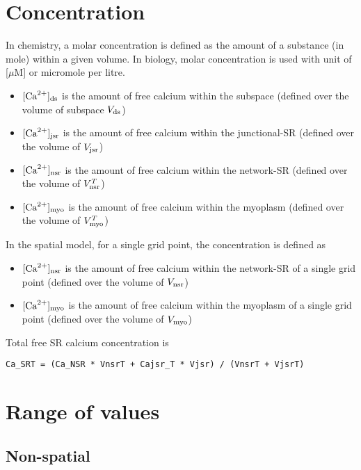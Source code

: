 \section{Concentration}
\label{sec:concentration}

In chemistry, a molar concentration is defined as the amount of a substance (in
mole) within a given volume. In biology, molar concentration is used with unit
of [$\mu$M] or micromole per litre. 
\begin{itemize}
  \item $[{\text{Ca}^{2+}}]_{\text{ds}}$ is the amount of free calcium within the subspace (defined
  over the volume of subspace $V_{\text{ds}}$)
  \item $[{\text{Ca}^{2+}}]_{\text{jsr}}$ is the amount of free calcium within the junctional-SR
  (defined over the volume of $V_{\text{jsr}}$)
  \item $[{\text{Ca}^{2+}}]_{\text{nsr}}$ is the amount of free calcium within the network-SR
  (defined over the volume of $V^T_{\text{nsr}}$)
  \item $[{\text{Ca}^{2+}}]_{\text{myo}}$ is the amount of free calcium within the myoplasm (defined
  over the volume of $V^T_{\text{myo}}$)
\end{itemize}

In the spatial model, for a single grid point, the concentration is defined as
\begin{itemize}
  \item $[{\text{Ca}^{2+}}]_{\text{nsr}}$ is the amount of free calcium within the network-SR
  of a single grid point (defined over the volume of $V_{\text{nsr}}$)
  \item $[{\text{Ca}^{2+}}]_{\text{myo}}$ is the amount of free calcium within the myoplasm
  of a single grid point (defined over the volume of $V_{\text{myo}}$)
\end{itemize}

Total free SR calcium concentration is 
\begin{verbatim}
Ca_SRT = (Ca_NSR * VnsrT + Cajsr_T * Vjsr) / (VnsrT + VjsrT)
\end{verbatim}



\section{Range of values}
\label{sec:range_values}

\subsection{Non-spatial}
\label{sec:ranges_non-spatial}

